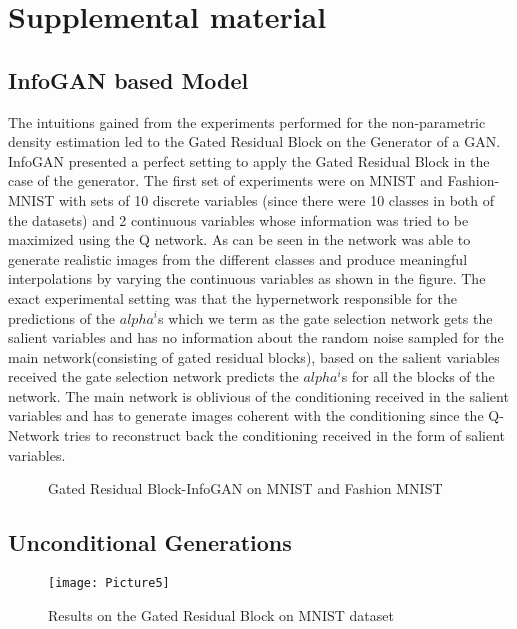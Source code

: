 
\section*{Supplemental material}


\subsection{InfoGAN based Model}
The intuitions gained from the experiments performed for the non-parametric density estimation led to the Gated Residual Block on the Generator of a GAN. InfoGAN \cite{chen2016infogan} presented a perfect setting to apply the Gated Residual Block in the case of the generator. The first set of experiments were on MNIST and Fashion-MNIST with sets of 10 discrete variables (since there were 10 classes in both of the datasets) and 2 continuous variables whose information was tried to be maximized using the Q network. As can be seen in  the network was able to generate realistic images from the different classes and produce meaningful interpolations by varying the continuous variables as shown in the figure. The exact experimental setting was that the hypernetwork responsible for the predictions of the $alpha^i$s which we term as the gate selection network gets the salient variables and has no information about the random noise sampled for the main network(consisting of gated residual blocks), based on the salient variables received the gate selection network predicts the  $alpha^i$s for all the blocks of the network. The main network is oblivious of the conditioning received in the salient variables and has to generate images coherent with the conditioning since the Q-Network tries to reconstruct back the conditioning received in the form of salient variables. 

\begin{figure}[t]%
    \centering
    \caption{Gated Residual Block-InfoGAN on MNIST and Fashion MNIST }
    \label{fig:infogan_unconditional}
    \vspace{-3mm}
\end{figure}

\subsection{Unconditional Generations}
\begin{figure}[t]
    \centering
    \texttt{[image: Picture5]}
    \caption{Results on the Gated Residual Block on MNIST dataset}\label{fig:grb_mnist}
    \vspace{-4mm}
\end{figure}

